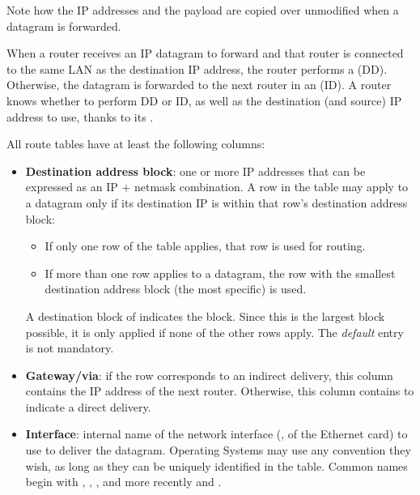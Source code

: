 \begin{remark}
 Note how the IP addresses and the payload are copied over unmodified
  when a datagram is forwarded.
\end{remark}




When a router receives an IP datagram to forward and that router 
is connected to the same LAN as the destination IP address, the router performs a  (DD).
% 
Otherwise, the datagram is forwarded to the next router in an  (ID).
% 
A router knows whether to perform DD or ID, as well as the destination (and source) IP address to use,
thanks to its .

All route tables have at least the following columns:
\begin{itemize}
\item \textbf{Destination address block}: one or more IP addresses that can be expressed as an IP + netmask combination.
  A row in the table may apply to a datagram only if its destination IP is within that row's destination address block:
  \begin{itemize}
  \item If only one row of the table applies, that row is used for routing.
  \item If more than one row applies to a datagram, the row with the smallest destination address block 
    (the most specific) is used.
  \end{itemize}
  A destination block of  indicates the  block.
  Since this is the largest block possible, it is only applied if none of the other rows apply. 
  The \textit{default} entry is not mandatory.\\[-0.3cm]
  
\item \textbf{Gateway/via}: if the row corresponds to an indirect delivery, this column contains the IP address
  of the next router. Otherwise, this column contains  to indicate a direct delivery.\\[-0.3cm]
  
\item \textbf{Interface}: internal name of the network interface (\eg, of the Ethernet card) to use to deliver the 
  datagram. Operating Systems may use any convention they wish, as long as they can be uniquely identified in the table.
  Common names begin with , , , 
  and more recently  and .
\end{itemize}

